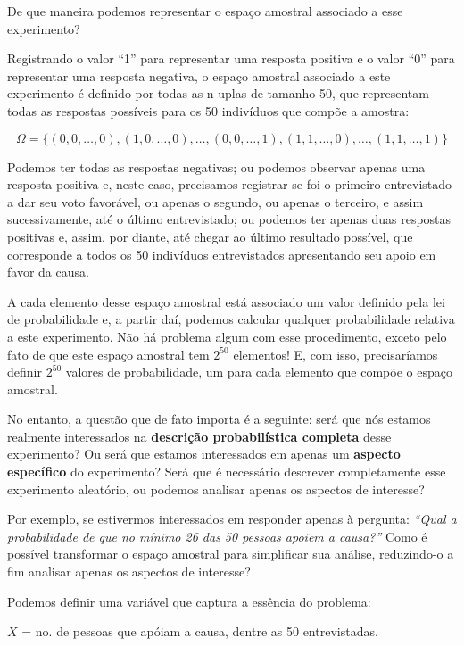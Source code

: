 \documentclass[
]{book}
\theoremstyle{definition}
\theoremstyle{definition}
\theoremstyle{definition}
\theoremstyle{remark}
\begin{document}
De que maneira podemos representar o espaço amostral associado a esse experimento?

Registrando o valor ``1'' para representar uma resposta positiva e o valor ``0'' para representar uma resposta negativa, o espaço amostral associado a este experimento é definido por todas as n-uplas de tamanho 50, que representam todas as respostas possíveis para os 50 indivíduos que compõe a amostra:

\[\Omega = \{ (0, 0, \ldots, 0), (1, 0, \ldots, 0), \ldots, (0, 0, \ldots, 1), (1, 1, \ldots, 0), \ldots, (1, 1, \ldots, 1)\}\]

Podemos ter todas as respostas negativas; ou podemos observar apenas uma resposta positiva e, neste caso, precisamos registrar se foi o primeiro entrevistado a dar seu voto favorável, ou apenas o segundo, ou apenas o terceiro, e assim sucessivamente, até o último entrevistado; ou podemos ter apenas duas respostas positivas e, assim, por diante, até chegar ao último resultado possível, que corresponde a todos os 50 indivíduos entrevistados apresentando seu apoio em favor da causa.

A cada elemento desse espaço amostral está associado um valor definido pela lei de probabilidade e, a partir daí, podemos calcular qualquer probabilidade relativa a este experimento. Não há problema algum com esse procedimento, exceto pelo fato de que este espaço amostral tem \(2^{50}\) elementos! E, com isso, precisaríamos definir \(2^{50}\) valores de probabilidade, um para cada elemento que compõe o espaço amostral.

No entanto, a questão que de fato importa é a seguinte: será que nós estamos realmente interessados na \textbf{descrição probabilística completa} desse experimento? Ou será que estamos interessados em apenas um \textbf{aspecto específico} do experimento? Será que é necessário descrever completamente esse experimento aleatório, ou podemos analisar apenas os aspectos de interesse?

Por exemplo, se estivermos interessados em responder apenas à pergunta: \emph{``Qual a probabilidade de que no mínimo 26 das 50 pessoas apoiem a causa?''} Como é possível transformar o espaço amostral para simplificar sua análise, reduzindo-o a fim analisar apenas os aspectos de interesse?

Podemos definir uma variável que captura a essência do problema:

\(X\) = no. de pessoas que apóiam a causa, dentre as 50 entrevistadas.
\end{document}
